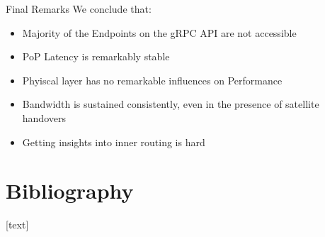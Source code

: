 \documentclass[NET,english,beameralt]{tumbeamer}
\begin{document}
\begin{frame}[fragile]{Final Remarks}
    We conclude that:
    \begin{itemize}
        \item Majority of the Endpoints on the gRPC API are not accessible
        \item PoP Latency is remarkably stable
        \item Phyiscal layer has no remarkable influences on Performance
        \item Bandwidth is sustained consistently, even in the presence of satellite handovers
        \item Getting insights into inner routing is hard
    \end{itemize}
\end{frame}


\section{Bibliography}
\begin{frame}[allowframebreaks]
    
    [text]
    \footnotesize
    
\end{frame}
\end{document}
